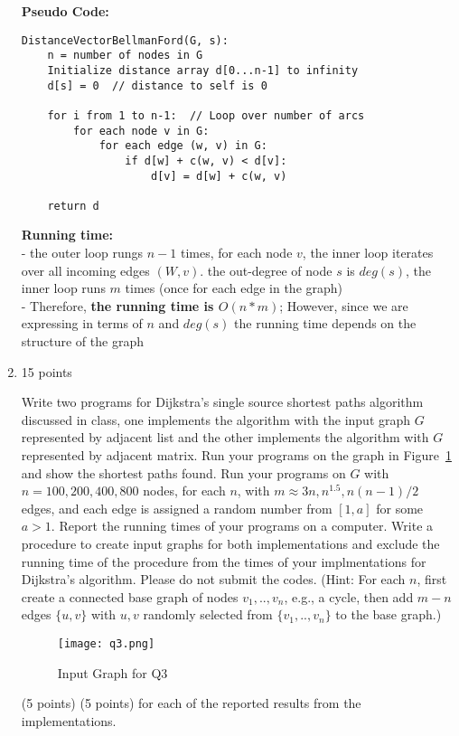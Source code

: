 \documentclass[letterpaper,12pt]{article}
\begin{document}
\begin{enumerate}
\textbf{Pseudo Code:}
\begin{verbatim}
DistanceVectorBellmanFord(G, s):
    n = number of nodes in G
    Initialize distance array d[0...n-1] to infinity
    d[s] = 0  // distance to self is 0
    
    for i from 1 to n-1:  // Loop over number of arcs
        for each node v in G:
            for each edge (w, v) in G:
                if d[w] + c(w, v) < d[v]:
                    d[v] = d[w] + c(w, v)
    
    return d
\end{verbatim}

\textbf{Running time:} \\
- the outer loop rungs $n-1$ times, for each node $v$, the inner loop iterates over all incoming edges $(W,v)$. the out-degree of node $s$ is $deg(s)$, the inner loop runs $m$ times (once for each edge in the graph) \\
- Therefore, \textbf{the running time is $O(n*m)$}; However, since we are expressing in terms of $n$ and $deg(s)$ the running time depends on the structure of the graph


\item 15 points

Write two programs for Dijkstra's single source shortest paths algorithm discussed
in class, one implements the algorithm with the input graph $G$ represented by
adjacent list and the other implements the algorithm with $G$ represented by
adjacent matrix. Run your programs on the graph in Figure~\ref{fig-1} and show
the shortest paths found. Run your programs on $G$ with $n=100,200,400,800$
nodes, for each $n$, with $m\approx 3n,n^{1.5},n(n-1)/2$ edges, and each edge is
assigned a random number from $[1,a]$ for some $a>1$. Report the running times of
your programs on a computer. Write a procedure to create input graphs for both
implementations and exclude the running time of the procedure from the times of
your implmentations for Dijkstra's algorithm. Please do not submit the codes.
(Hint: For each $n$, first create a connected base graph of nodes $v_1,..,v_n$, e.g.,
a cycle, then add $m-n$ edges $\{u,v\}$ with $u,v$ randomly selected from $\{v_1,..,v_n\}$
to the base graph.)

\begin{figure}
    \centering
    \texttt{[image: q3.png]}
    \caption{Input Graph for Q3}
    \label{fig-1}
\end{figure}

(5 points)
(5 points) for each of the reported results from the implementations. \\


\end{enumerate}
\end{document}
